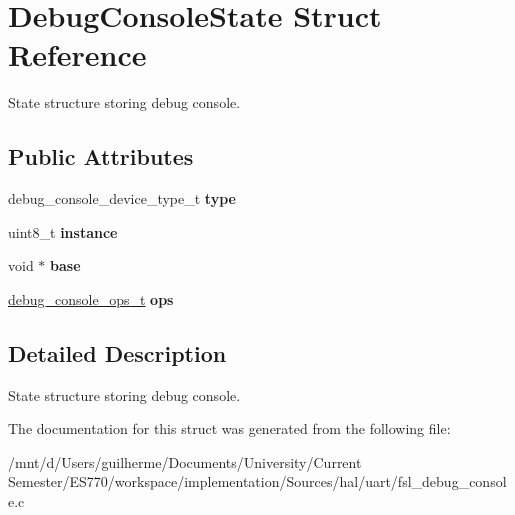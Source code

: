 \hypertarget{structDebugConsoleState}{\section{Debug\-Console\-State Struct Reference}
\label{structDebugConsoleState}
}


State structure storing debug console.  


\subsection*{Public Attributes}
\begin{DoxyCompactItemize}
\item 
\hypertarget{structDebugConsoleState_af22f1d9c19fa4722a7e28bb47aa3789e}{debug\-\_\-console\-\_\-device\-\_\-type\-\_\-t {\bfseries type}}\label{structDebugConsoleState_af22f1d9c19fa4722a7e28bb47aa3789e}

\item 
\hypertarget{structDebugConsoleState_a249152246983451efaed8a0f533a046d}{uint8\-\_\-t {\bfseries instance}}\label{structDebugConsoleState_a249152246983451efaed8a0f533a046d}

\item 
\hypertarget{structDebugConsoleState_acb33af165611dfd84a472faae1dd616a}{void $\ast$ {\bfseries base}}\label{structDebugConsoleState_acb33af165611dfd84a472faae1dd616a}

\item 
\hypertarget{structDebugConsoleState_a839b4664a5a0a6a4ba09f1b998aa881b}{\hyperlink{structDebugConsoleOperationFunctions}{debug\-\_\-console\-\_\-ops\-\_\-t} {\bfseries ops}}\label{structDebugConsoleState_a839b4664a5a0a6a4ba09f1b998aa881b}

\end{DoxyCompactItemize}


\subsection{Detailed Description}
State structure storing debug console. 

The documentation for this struct was generated from the following file\-:\begin{DoxyCompactItemize}
\item 
/mnt/d/\-Users/guilherme/\-Documents/\-University/\-Current Semester/\-E\-S770/workspace/implementation/\-Sources/hal/uart/fsl\-\_\-debug\-\_\-console.\-c\end{DoxyCompactItemize}

